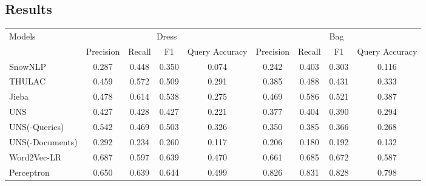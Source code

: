 \subsection{Results}
\label{sec:results}

\begin{table}[h!]
	\centering
	\small
	\begin{tabular}{lcccccccc}%
		\toprule
		\multirow{2}{*}{Models} & \multicolumn{4}{c}{Dress} & \multicolumn{4}{c}{Bag}                                                                                                       \\
		\cmidrule(lr){2-5} \cmidrule(lr){6-9}
		                        & Precision                 & Recall                  & F1             & Query Accuracy & Precision      & Recall         & F1             & Query Accuracy \\
		\midrule
		SnowNLP                 & 0.287                     & 0.448                   & 0.350          & 0.074          & 0.242          & 0.403          & 0.303          & 0.116          \\
		THULAC                  & 0.459                     & 0.572                   & 0.509          & 0.291          & 0.385          & 0.488          & 0.431          & 0.333          \\
		Jieba                   & 0.478                     & 0.614                   & 0.538          & 0.275          & 0.469          & 0.586          & 0.521          & 0.387          \\
		\midrule
		UNS                     & 0.427                     & 0.428                   & 0.427          & 0.221          & 0.377          & 0.404          & 0.390          & 0.294          \\
		UNS(-Queries)           & 0.542                     & 0.469                   & 0.503          & 0.326          & 0.350          & 0.385          & 0.366          & 0.268          \\
		UNS(-Documents)         & 0.292                     & 0.234                   & 0.260          & 0.117          & 0.206          & 0.180          & 0.192          & 0.132          \\
		\midrule
		Word2Vec-LR             & 0.687                     & 0.597                   & 0.639          & 0.470          & 0.661          & 0.685          & 0.672          & 0.587          \\
		Perceptron              & 0.650                     & 0.639                   & 0.644          & 0.499          & 0.826          & 0.831          & 0.828          & 0.798          \\

\end{tabular}
\end{table}
